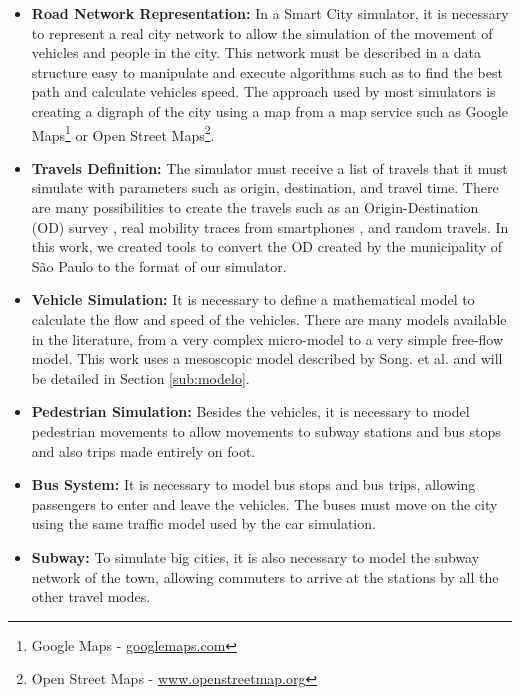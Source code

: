 \begin{itemize}

\item \textbf{Road Network Representation: } In a Smart City simulator, it is necessary to represent a real city network to allow the simulation of the movement of vehicles and people in the city. This network must be described in a data structure easy to manipulate and execute algorithms such as to find the best path and calculate vehicles speed. The approach used by most simulators is creating a digraph of the city using a map from a map service such as Google Maps\footnote{Google Maps - \url{googlemaps.com}} or Open Street Maps\footnote{Open Street Maps - \url{www.openstreetmap.org}}.

\item \textbf{Travels Definition: } The simulator must receive a list of travels that it must simulate with parameters such as origin, destination, and travel time. There are many possibilities to create the travels such as an Origin-Destination (OD) survey \citep{khan2016accurately}, real mobility traces from smartphones \citep{jamil2014crowdsensing}, and random travels. In this work, we created tools to convert the OD created by the municipality of S\~ao Paulo to the format of our simulator.

\item \textbf{Vehicle Simulation: } It is necessary to define a mathematical model to calculate the flow and speed of the vehicles. There are many models available in the literature, from a very complex micro-model to a very simple free-flow model. This work uses a mesoscopic model described by Song. et al. \citep{song2017gpusimulation} and will be detailed in Section \ref{sub:modelo}.

\item \textbf{Pedestrian Simulation: } Besides the vehicles, it is necessary to model pedestrian movements to allow movements to subway stations and bus stops and also trips made entirely on foot. 

\item \textbf{Bus System: } It is necessary to model bus stops and bus trips, allowing passengers to enter and leave the vehicles. The buses must move on the city using the same traffic model used by the car simulation. 

\item \textbf{Subway: } To simulate big cities, it is also necessary to model the subway network of the town, allowing commuters to arrive at the stations by all the other travel modes.


\end{itemize}
